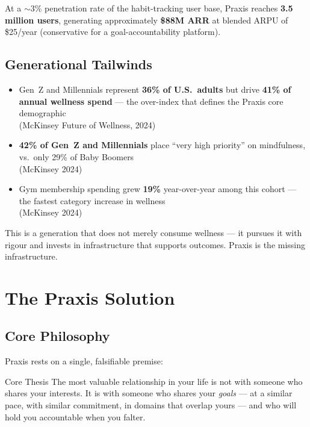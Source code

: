 \documentclass[11pt,a4paper]{article}
\begin{document}
At a $\sim$3\% penetration rate of the habit-tracking user base, Praxis reaches \textbf{3.5 million users}, generating approximately \textbf{\$88M ARR} at blended ARPU of \$25/year (conservative for a goal-accountability platform).

\subsection{Generational Tailwinds}

\begin{statbox}
\begin{itemize}[nosep]
  \item Gen~Z and Millennials represent \textbf{36\% of U.S.\ adults} but drive \textbf{41\% of annual wellness spend} — the over-index that defines the Praxis core demographic \\ {\small (McKinsey Future of Wellness, 2024)}
  \item \textbf{42\% of Gen~Z and Millennials} place ``very high priority'' on mindfulness, vs.\ only 29\% of Baby Boomers \\ {\small (McKinsey 2024)}
  \item Gym membership spending grew \textbf{19\%} year-over-year among this cohort — the fastest category increase in wellness \\ {\small (McKinsey 2024)}
\end{itemize}
\end{statbox}

This is a generation that does not merely consume wellness — it pursues it with rigour and invests in infrastructure that supports outcomes. Praxis is the missing infrastructure.

\section{The Praxis Solution}

\subsection{Core Philosophy}

Praxis rests on a single, falsifiable premise:

\begin{calloutbox}{Core Thesis}
The most valuable relationship in your life is not with someone who shares your interests. It is with someone who shares your \textit{goals} — at a similar pace, with similar commitment, in domains that overlap yours — and who will hold you accountable when you falter.
\end{calloutbox}
\end{document}
